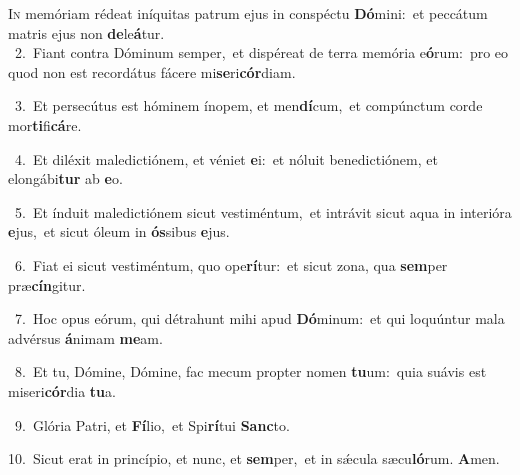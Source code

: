 \lettrine{\initial\textcolor{\initialcolor}{I}}{n} memóriam rédeat iníquitas patrum ejus in conspéctu \textbf{Dó}\-mini:~\star et peccátum matris ejus non \textbf{de}\-le\-\textbf{á}\-tur.\\
{\numbfont\textcolor{\numbcolor}{~2.}}~Fiant contra Dóminum semper,~\dagger et dispéreat de terra memória e\-\textbf{ó}\-rum:~\star pro eo quod non est recordátus fácere mi\-\textbf{se}\-ri\-\textbf{cór}\-diam.\par
{\numbfont\textcolor{\numbcolor}{~3.}}~Et persecútus est hóminem ínopem, et men\-\textbf{dí}\-cum,~\star et compúnctum corde mor\-\textbf{ti}\-fi\-\textbf{cá}\-re.\par
{\numbfont\textcolor{\numbcolor}{~4.}}~Et diléxit maledictiónem, et véniet \textbf{e}\-i:~\star et nóluit benedictiónem, et elongábi\textbf{tur} ab \textbf{e}\-o.\par
{\numbfont\textcolor{\numbcolor}{~5.}}~Et índuit maledictiónem sicut vestiméntum,~\dagger et intrávit sicut aqua in interióra \textbf{e}\-jus,~\star et sicut óleum in \textbf{ós}\-sibus \textbf{e}\-jus.\par
{\numbfont\textcolor{\numbcolor}{~6.}}~Fiat ei sicut vestiméntum, quo ope\-\textbf{rí}\-tur:~\star et sicut zona, qua \textbf{sem}\-per præ\-\textbf{cín}\-gitur.\par
{\numbfont\textcolor{\numbcolor}{~7.}}~Hoc opus eórum, qui détrahunt mihi apud \textbf{Dó}\-minum:~\star et qui loquúntur mala advérsus \textbf{á}\-nimam \textbf{me}\-am.\par
{\numbfont\textcolor{\numbcolor}{~8.}}~Et tu, Dómine, Dómine, fac mecum propter nomen \textbf{tu}\-um:~\star quia suávis est miseri\-\textbf{cór}\-dia \textbf{tu}\-a.\par
{\numbfont\textcolor{\numbcolor}{~9.}}~Glória Patri, et \textbf{Fí}\-lio,~\star et Spi\-\textbf{rí}\-tui \textbf{Sanc}\-to.\par
{\numbfont\textcolor{\numbcolor}{10.}}~Sicut erat in princípio, et nunc, et \textbf{sem}\-per,~\star et in sǽcula sæcu\-\textbf{ló}\-rum. \textbf{A}\-men.\par

